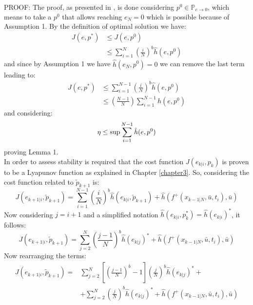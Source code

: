 {PROOF:} The proof, as presented in \cite{alamir2018stability}, is done considering $p^0 \in \mathbb{P}_{e \to 0}$, which means to take a $p^0$ that allows reaching $e_N=0$ which is possible because of Assumption 1. By the definition of optimal solution we have: 
\begin{equation}
\begin{split}
	J(e,p^*)&\leq J(e,p^0) \\
	&\leq \sum_{i=1}^{N}\left(\frac{i}{N}\right)^b\hat{h}(e,p^0)
\end{split}
\end{equation}
and since by Assumption 1 we have $\hat{h}(e_N,p^0)=0$ we can remove the last term leading to:
\begin{equation}
\begin{split}
	J(e,p^*)&\leq \sum_{i=1}^{N-1}\left(\frac{i}{N}\right)^b\hat{h}(e,p^0) \\
	&\leq \left(\frac{N-1}{N}\right)\sum_{i=1}^{N-1}\hat{h}(e,p^0)
\end{split}
\end{equation}
and considering:
\begin{equation}
 \eta \leq \textnormal{sup} \sum_{i=1}^{N-1}\hat{h}(e,p^0)
\end{equation}
proving Lemma 1. \\In order to assess stability is required that the cost function $J({e}_{k|i},{p}_k)$ is proven to be a Lyapunov function as explained in Chapter \ref{chapter3}. So, considering the cost function related to $\tilde{p}_{k+1}$ is:
\begin{equation*}
    J({e}_{k+1|i},\tilde{p}_{k+1})=\sum_{i=1}^{N-1}\left(\frac{i}{N}\right)^b \hat{h}({e}_{k|i},\tilde{p}_{k+1})+\hat{h}\left(f^+(x_{k-1|N},\bar{u},t_i),\bar{u}\right)
\end{equation*}
Now considering $j=i+1$ and a simplified notation $\hat{h}({e}_{k|i},p_{k}^*)=\hat{h}(e_{k|i})^*$, it follows: 
\begin{equation*}
    J({e}_{k+1|i},\tilde{p}_{k+1})=\sum_{j=2}^{N}\left(\frac{j-1}{N}\right)^b \hat{h}(e_{k|j})^*+\hat{h}\left(f^+(x_{k-1|N},\bar{u},t_i),\bar{u}\right)
\end{equation*}
Now rearranging the terms: 
\begin{equation*}
    \begin{split}
        J({e}_{k+1|i},\tilde{p}_{k+1})=&\sum_{j=2}^{N}\left[\left(\frac{j-1}{N}\right)^b-1\right]\left(\frac{j}{N}\right)^b \hat{h}(e_{k|j})^*+ \\
        &+\sum_{j=2}^{N}\left(\frac{j}{N}\right)^b \hat{h}(e_{k|j})^* + \hat{h}\left(f^+(x_{k-1|N},\bar{u},t_i),\bar{u}\right)
    \end{split}
\end{equation*}
